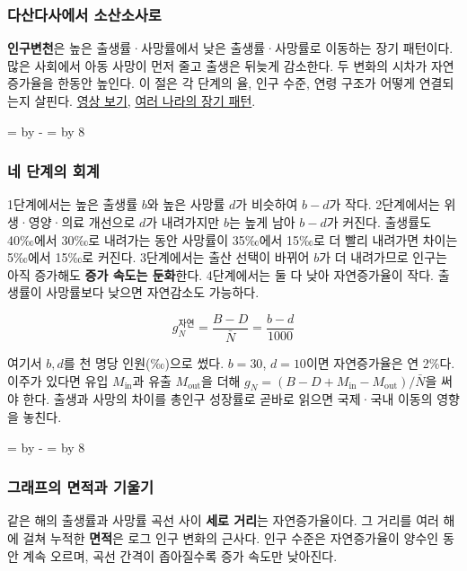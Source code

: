 \documentclass[10pt,a4paper]{article}
\newcommand{\ReserveReadingSectionSpace}{%
  \par\begingroup
  \dimen0=\pagegoal \advance\dimen0 by -\pagetotal
  \dimen2=\baselineskip \multiply\dimen2 by 8
  \ifdim\dimen0<\dimen2 \newpage\fi
  \endgroup}
\begin{document}
\subsubsection*{다산다사에서 소산소사로}

\textbf{인구변천}은 높은 출생률·사망률에서 낮은 출생률·사망률로 이동하는 장기 패턴이다. 많은 사회에서 아동 사망이 먼저 줄고 출생은 뒤늦게 감소한다. 두 변화의 시차가 자연증가율을 한동안 높인다. 이 절은 각 단계의 율, 인구 수준, 연령 구조가 어떻게 연결되는지 살핀다. \href{https://youtu.be/J4jeB1QHjOY}{영상 보기}, \href{https://ourworldindata.org/demographic-transition}{여러 나라의 장기 패턴}.\par

\ReserveReadingSectionSpace
\subsubsection*{네 단계의 회계}

1단계에서는 높은 출생률 $b$와 높은 사망률 $d$가 비슷하여 $b-d$가 작다. 2단계에서는 위생·영양·의료 개선으로 $d$가 내려가지만 $b$는 높게 남아 $b-d$가 커진다. 출생률도 40‰에서 30‰로 내려가는 동안 사망률이 35‰에서 15‰로 더 빨리 내려가면 차이는 5‰에서 15‰로 커진다. 3단계에서는 출산 선택이 바뀌어 $b$가 더 내려가므로 인구는 아직 증가해도 \textbf{증가 속도는 둔화}한다. 4단계에서는 둘 다 낮아 자연증가율이 작다. 출생률이 사망률보다 낮으면 자연감소도 가능하다.\par

\[
g_N^{\mbox{자연}}=\frac{B-D}{\bar N}=\frac{b-d}{1000}
\]

여기서 $b,d$를 천 명당 인원(‰)으로 썼다. $b=30$, $d=10$이면 자연증가율은 연 2\%다. 이주가 있다면 유입 $M_{\mathrm{in}}$과 유출 $M_{\mathrm{out}}$을 더해 $g_N=(B-D+M_{\mathrm{in}}-M_{\mathrm{out}})/\bar N$을 써야 한다. 출생과 사망의 차이를 총인구 성장률로 곧바로 읽으면 국제·국내 이동의 영향을 놓친다.\par

\ReserveReadingSectionSpace
\subsubsection*{그래프의 면적과 기울기}

같은 해의 출생률과 사망률 곡선 사이 \textbf{세로 거리}는 자연증가율이다. 그 거리를 여러 해에 걸쳐 누적한 \textbf{면적}은 로그 인구 변화의 근사다. 인구 수준은 자연증가율이 양수인 동안 계속 오르며, 곡선 간격이 좁아질수록 증가 속도만 낮아진다.\par
\end{document}
